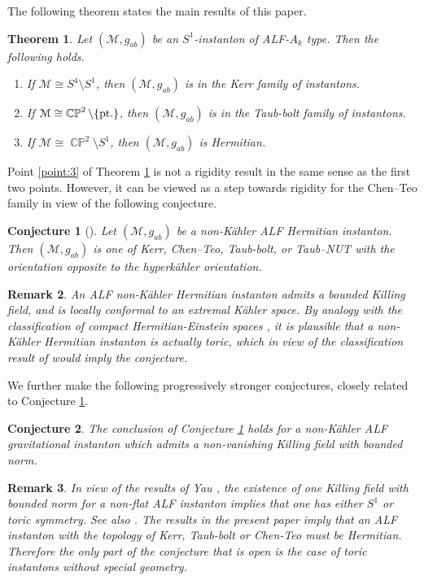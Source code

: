 \documentclass[a4paper,10pt,reqno]{amsart}
\newcommand{\cM}{\mathcal{M}}
\theoremstyle{plain}
\newtheorem{thm}{Theorem}[section]
\newtheorem{conj}{Conjecture}
\newtheorem{remark}[thm]{Remark}
\DeclareMathOperator{\CP}{\mathbb{C}\mathbb{P}}
\numberwithin{equation}{section}
\begin{document}
The following theorem states the main results of this paper.  
\begin{thm}\label{thm:main-intro} Let $(\cM, g_{ab})$ be an $S^1$-instanton of ALF-$A_k$ type. Then the following holds. 
\begin{enumerate} 
\item \label{point:Kerr} 
If $\cM \cong S^4 \setminus S^1$, then $(\cM, g_{ab})$ is in the Kerr family of instantons.
\item \label{point:T-b} 
If $\cM \cong \CP^2 \setminus \{\text{\rm pt.}\}$, then $(\cM, g_{ab})$ is in the Taub-bolt family of instantons.
\item \label{point:3} 
If $\cM \cong \CP^2 \setminus S^1$, then $(\cM, g_{ab})$ is Hermitian. 
\end{enumerate} 
\end{thm} 
Point \ref{point:3} of Theorem \ref{thm:main-intro} is not a rigidity result in the same sense as the first two points. However, it can be viewed as a step towards rigidity for the Chen--Teo family in view of the following conjecture.   
\begin{conj}[] \label{conj:Herm-class} Let $(\cM, g_{ab})$ be a non-K\"ahler ALF  Hermitian instanton. Then $(\cM, g_{ab})$ is one of Kerr, Chen--Teo, Taub-bolt, or Taub--NUT with the orientation opposite to the hyperk\"ahler orientation. 
\end{conj} 
\begin{remark} 
An ALF non-K\"ahler Hermitian instanton admits a bounded Killing field, and is locally conformal to an extremal K\"ahler space. By analogy with the classification of compact Hermitian-Einstein spaces \cite{MR2899877},  it is plausible that a non-K\"ahler Hermitian instanton is actually toric, which in view of the classification result of \cite{Biquard:Gauduchon} would imply the conjecture.  
\end{remark} 
We further make the following progressively stronger conjectures, closely related to Conjecture \ref{conj:Herm-class}. 
\begin{conj} \label{conj:KVF-class} The conclusion of Conjecture \ref{conj:Herm-class} holds for a non-K\"ahler ALF gravitational instanton which admits a non-vanishing Killing field with bounded norm.
\end{conj}
\begin{remark} 
In view of the results of  Yau \cite{MR448379}, the existence of one Killing field with bounded norm for a non-flat ALF instanton implies that one has either  $S^1$ or toric symmetry. See also \cite[\S 2]{gibbons:hawking:1979}. The results in the present paper imply that an ALF instanton with the topology of Kerr, Taub-bolt or Chen-Teo must be Hermitian. Therefore the only part of the conjecture that is open is the case of toric instantons without special geometry. 
\end{remark}
\end{document}
